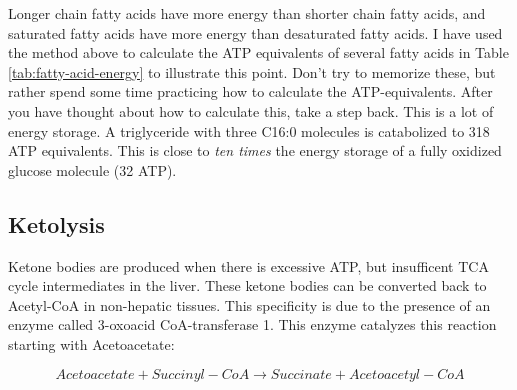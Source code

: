 \documentclass{tufte-handout}
\begin{document}
  Longer chain fatty acids have more energy than shorter chain fatty acids, and saturated fatty acids have more energy than desaturated fatty acids.  I have used the method above to calculate the ATP equivalents of several fatty acids in Table \ref{tab:fatty-acid-energy} to illustrate this point.  Don't try to memorize these, but rather spend some time practicing how to calculate the ATP-equivalents.  After you have thought about how to calculate this, take a step back.  This is a lot of energy storage.  A triglyceride with three C16:0 molecules is catabolized to 318 ATP equivalents.  This is close to \emph{ten times} the energy storage of a fully oxidized glucose molecule (32 ATP).

\subsection{Ketolysis}

Ketone bodies are produced when there is excessive ATP, but insufficent TCA cycle intermediates in the liver.  These ketone bodies can be converted back to Acetyl-CoA in non-hepatic tissues.  This specificity is due to the presence of an enzyme called 3-oxoacid CoA-transferase 1.  This enzyme catalyzes this reaction starting with Acetoacetate:

\begin{equation}\label{eq:oxct1}
Acetoacetate + Succinyl-CoA \rightarrow Succinate + Acetoacetyl-CoA
\end{equation} 
\end{document}
